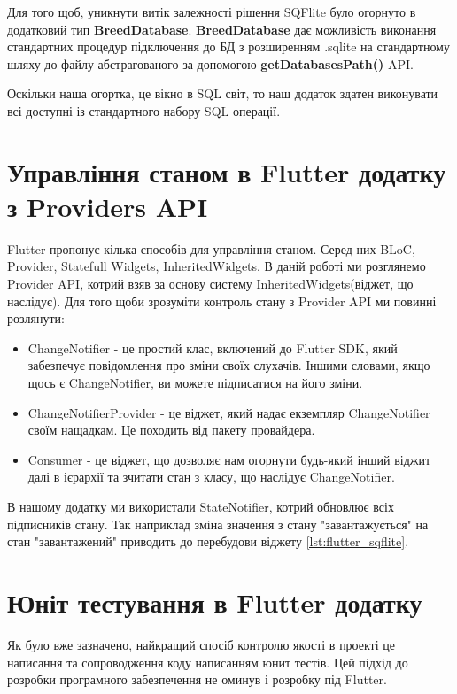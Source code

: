 Для того щоб, уникнути витік залежності рішення SQFlite було огорнуто в додатковий тип \textbf{BreedDatabase}.
\textbf{BreedDatabase} дає можливість виконання стандартних процедур підключення до БД з розширенням .sqlite
на стандартному шляху до файлу абстрагованого за допомогою \textbf{getDatabasesPath()} API.

Оскільки наша огортка, це вікно в SQL світ, то наш додаток здатен виконувати всі доступні із стандартного набору
SQL операції.


\section{Управління станом в Flutter додатку з Providers API}
\label{section.2.7}
Flutter пропонує кілька способів для управління станом. Серед них BLoC, Provider, Statefull Widgets, InheritedWidgets.
В даній роботі ми розглянемо Provider API, котрий взяв за основу систему InheritedWidgets(віджет, що наслідує).
Для того щоби зрозуміти контроль стану з Provider API ми повинні розлянути:

\begin{itemize}
    \item ChangeNotifier - це простий клас, включений до Flutter SDK, який забезпечує повідомлення про зміни своїх слухачів. Іншими словами, якщо щось є ChangeNotifier, ви можете підписатися на його зміни.
    \item ChangeNotifierProvider - це віджет, який надає екземпляр ChangeNotifier своїм нащадкам. Це походить від пакету провайдера.
    \item Consumer - це віджет, що дозволяє нам огорнути будь-який інший віджит далі в ієрархії та зчитати стан з класу, що наслідує ChangeNotifier.
\end{itemize}

В нашому додатку ми використали StateNotifier, котрий обновлює всіх підписників стану.
Так наприклад зміна значення з стану "завантажується" на стан "завантажений" приводить до перебудови віджету \ref{lst:flutter_sqflite}.


\section{Юніт тестування в Flutter додатку}
\label{section.2.8}
Як було вже зазначено, найкращий спосіб контролю якості в проекті це написання та сопроводження коду написанням юнит тестів.
Цей підхід до розробки програмного забезпечення не оминув і розробку під Flutter.

